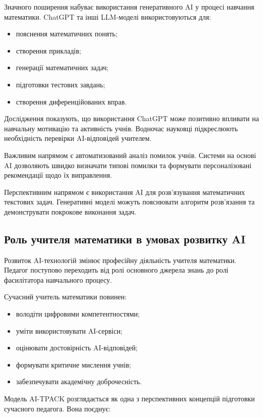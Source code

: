 Значного поширення набуває використання генеративного AI у процесі навчання математики. ChatGPT та інші LLM-моделі використовуються для:

\begin{itemize}
\item пояснення математичних понять;
\item створення прикладів;
\item генерації математичних задач;
\item підготовки тестових завдань;
\item створення диференційованих вправ.
\end{itemize}

Дослідження показують, що використання ChatGPT може позитивно впливати на навчальну мотивацію та активність учнів. Водночас науковці підкреслюють необхідність перевірки AI-відповідей учителем.

Важливим напрямом є автоматизований аналіз помилок учнів. Системи на основі AI дозволяють швидко визначати типові помилки та формувати персоналізовані рекомендації щодо їх виправлення.

Перспективним напрямом є використання AI для розв’язування математичних текстових задач. Генеративні моделі можуть пояснювати алгоритм розв’язання та демонструвати покрокове виконання задач.

\subsection{Роль учителя математики в умовах розвитку AI}

Розвиток AI-технологій змінює професійну діяльність учителя математики. Педагог поступово переходить від ролі основного джерела знань до ролі фасилітатора навчального процесу.

Сучасний учитель математики повинен:

\begin{itemize}
\item володіти цифровими компетентностями;
\item уміти використовувати AI-сервіси;
\item оцінювати достовірність AI-відповідей;
\item формувати критичне мислення учнів;
\item забезпечувати академічну доброчесність.
\end{itemize}

Модель AI-TPACK розглядається як одна з перспективних концепцій підготовки сучасного педагога. Вона поєднує:

